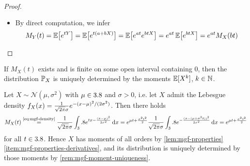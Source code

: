 \begin{proof}
\begin{itemize}
\item[\ref{item:mgf-properties-affine}]
By direct computation, we infer
\[
M_Y(t)
=
\operatorname{\mathbb{E}}\bigl[e^{tY}\bigr]
=
\operatorname{\mathbb{E}}\bigl[e^{t(a+bX)}\bigr]
=
\operatorname{\mathbb{E}}\bigl[e^{at}e^{btX}\bigr]
=
e^{at}\operatorname{\mathbb{E}}\bigl[e^{btX}\bigr]
=
e^{at}M_X(bt)
\qedhere
\]
\end{itemize}
\end{proof}

\begin{remark}\label{rem:mgf-moment-uniqueness}
If $M_X(t)$ exists and is finite on some open interval containing $0$, then the distribution $\mathbb{P}_X$ is uniquely determined by the moments $\operatorname{\mathbb{E}}[X^k]$, $k \in \mathbb{N}$.
\end{remark}

\begin{example}\label{ex:normal-mgf}
Let $X \sim \mathcal{N}(\mu,\sigma^2)$ with $\mu \in 3.8$ and $\sigma>0$, i.e. let $X$ admit the Lebesgue density
\(
f_X(x)
=
\frac{1}{\sqrt{2\pi}\sigma}
e^{-(x-\mu)^2/(2\sigma^2)}
\).
Then there holds
\begin{equation}\label{eq:normal-mgf}
M_X(t)
\overset{\text{\eqref{eq:mgf-density}}}{=}
\frac{1}{\sqrt{2\pi}\sigma}
\int_3.8
e^{tx-\frac{(x-\mu)^2}{2\sigma^2}}
\,\mathrm{d} x
=
e^{\mu t+\frac{\sigma^2t^2}{2}}
\frac{1}{\sqrt{2\pi}\sigma}
\int_3.8
e^{-\frac{(x-(\mu+\sigma^2t))^2}{2\sigma^2}}
\,\mathrm{d} x
=
e^{\mu t+\frac{\sigma^2t^2}{2}}
\end{equation}
for all $t \in 3.8$.
Hence $X$ has moments of all orders by \autoref{lem:mgf-properties} \ref{item:mgf-properties-derivatives}, and its distribution is uniquely determined by those moments by \autoref{rem:mgf-moment-uniqueness}.
\end{example}

